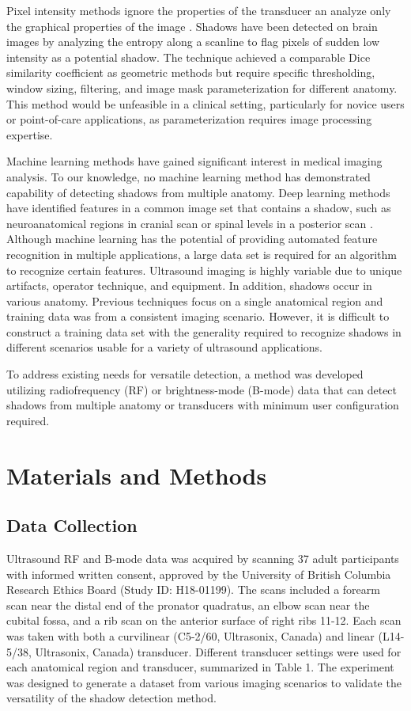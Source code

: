 \documentclass[preprint,5p,authoryear]{elsarticle}
\begin{document}
Pixel intensity methods ignore the properties of the transducer an analyze only the graphical properties of the image \citep{Hellier2010}. Shadows have been detected on brain images by analyzing the entropy along a scanline to flag pixels of sudden low intensity as a potential shadow. The technique achieved a comparable Dice similarity coefficient as geometric methods but require specific thresholding, window sizing, filtering, and image mask parameterization for different anatomy. This method would be unfeasible in a clinical setting, particularly for novice users or point-of-care applications, as parameterization requires image processing expertise.

Machine learning methods have gained significant interest in medical imaging analysis. To our knowledge, no machine learning method has demonstrated capability of detecting shadows from multiple anatomy. Deep learning methods have identified features in a common image set that contains a shadow, such as neuroanatomical regions in cranial scan \citep{Milletari2017} or spinal levels in a posterior scan \citep{Hetherington2017}. Although machine learning has the potential of providing automated feature recognition in multiple applications, a large data set is required for an algorithm to recognize certain features. Ultrasound imaging is highly variable due to unique artifacts, operator technique, and equipment. In addition, shadows occur in various anatomy. Previous techniques focus on a single anatomical region and training data was from a consistent imaging scenario. However, it is difficult to construct a training data set with the generality required to recognize shadows in different scenarios usable for a variety of ultrasound applications.

To address existing needs for versatile detection, a method was developed utilizing radiofrequency (RF) or brightness-mode (B-mode) data that can detect shadows from multiple anatomy or transducers with minimum user configuration required. 

\section*{Materials and Methods}
\label{MaM}
\subsection*{Data Collection}
Ultrasound RF and B-mode data was acquired by scanning 37 adult participants with informed written consent, approved by the University of British Columbia Research Ethics Board (Study ID: H18-01199). The scans included a forearm scan near the distal end of the pronator quadratus, an elbow scan near the cubital fossa, and a rib scan on the anterior surface of right ribs 11-12. Each scan was taken with both a curvilinear (C5-2/60, Ultrasonix, Canada) and linear (L14-5/38, Ultrasonix, Canada) transducer. Different transducer settings were used for each anatomical region and transducer, summarized in Table 1. The experiment was designed to generate a dataset from various imaging scenarios to validate the versatility of the shadow detection method.
\end{document}
